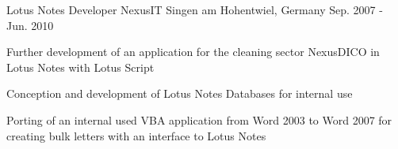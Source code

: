 \begin{cventries}
  \cventry
    {Lotus Notes Developer} %
    {Nexus\/IT} %
    {Singen am Hohentwiel, Germany} %
    {Sep. 2007 - Jun. 2010} %
    {
      \begin{cvitems} %
        \item {Further development of an application for the cleaning sector Nexus\/DICO in Lotus Notes with Lotus Script}
        \item {Conception and development of Lotus Notes Databases for internal use}
        \item {Porting of an internal used VBA application from Word 2003 to Word 2007 for creating bulk letters with an interface to Lotus Notes}
      \end{cvitems}
    }

\end{cventries}
